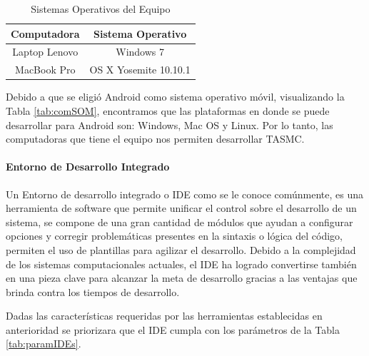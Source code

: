 \begin{table}[h] 
	\begin{center}
		\begin{tabular}{|c|c|}
			\hline \rowcolor[RGB]{51,153,255} 
			\textcolor{blanco}{\bf Computadora} &
				\textcolor{blanco}{\bf Sistema Operativo} \\
			\hline 
				Laptop Lenovo &
				Windows 7 \\
      		\hline \rowcolor[RGB]{240,248,255}
      			MacBook Pro &
				OS X Yosemite 10.10.1 \\
      		\hline 
    		\end{tabular}
	\end{center}
	\caption[Sistemas Operativos del Equipo]{Sistemas Operativos del Equipo} 
	\label{tab:SOE}
\end{table}

Debido a que se eligió Android como sistema operativo móvil, visualizando la Tabla \ref{tab:comSOM}, encontramos que las plataformas en donde se puede desarrollar para Android son: Windows, Mac OS y Linux. Por lo tanto, las computadoras que tiene el equipo nos permiten desarrollar TASMC.

\paragraph{Entorno de Desarrollo Integrado}

Un Entorno de desarrollo integrado o IDE como se le conoce comúnmente, es una herramienta de software que permite unificar el control sobre el desarrollo de un sistema, se compone de una gran cantidad de módulos que ayudan a configurar opciones y corregir problemáticas presentes en la sintaxis o lógica del código, permiten el uso de plantillas para agilizar el desarrollo. Debido a la complejidad de los sistemas computacionales actuales, el IDE ha logrado convertirse también en una pieza clave para alcanzar la meta de desarrollo gracias a las ventajas que brinda contra los tiempos de desarrollo.

Dadas las características requeridas por las herramientas establecidas en anterioridad se priorizara que el IDE cumpla con los parámetros de la Tabla \ref{tab:paramIDEs}.

